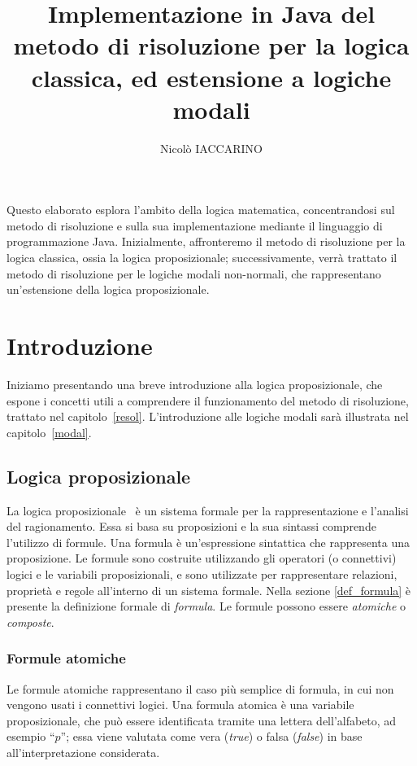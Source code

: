 \documentclass[a4paper,12pt]{report}
\begin{document}
\title{Implementazione in Java del metodo di risoluzione per la logica classica, ed estensione a logiche modali}
\author{Nicolò IACCARINO}
% 
%
\beforepreface

% 
%
Questo elaborato esplora l'ambito della logica matematica, concentrandosi sul metodo di risoluzione e sulla sua implementazione mediante il linguaggio di programmazione Java. Inizialmente, affronteremo il metodo di risoluzione per la logica classica, ossia la logica proposizionale; successivamente, verrà trattato il metodo di risoluzione per le logiche modali non-normali, che rappresentano un'estensione della logica proposizionale.

\afterpreface
\pagestyle{mystyle} %
% 
% 
\chapter{Introduzione}
\label{intro}
Iniziamo presentando una breve introduzione alla logica proposizionale, che espone i concetti utili a comprendere il funzionamento del metodo di risoluzione, trattato nel capitolo~\ref{resol}. L'introduzione alle logiche modali sarà illustrata nel capitolo~\ref{modal}.

\section{Logica proposizionale}
La logica proposizionale~\cite{logica_prop} è un sistema formale per la rappresentazione e l'analisi del ragionamento. Essa si basa su proposizioni e la sua sintassi comprende l'utilizzo di formule. Una formula è un'espressione sintattica che rappresenta una proposizione. Le formule sono costruite utilizzando gli operatori (o connettivi) logici e le variabili proposizionali, e sono utilizzate per rappresentare relazioni, proprietà e regole all'interno di un sistema formale. Nella sezione \ref{def_formula} è presente la definizione formale di \emph{formula}. Le formule possono essere \emph{atomiche} o \emph{composte}.

\subsection*{Formule atomiche}
Le formule atomiche rappresentano il caso più semplice di formula, in cui non vengono usati i connettivi logici. Una formula atomica è una variabile proposizionale, che può essere identificata tramite una lettera dell'alfabeto, ad esempio ``$p$''; essa viene valutata come vera (\emph{true}) o falsa (\emph{false}) in base all'interpretazione considerata.
\end{document}
